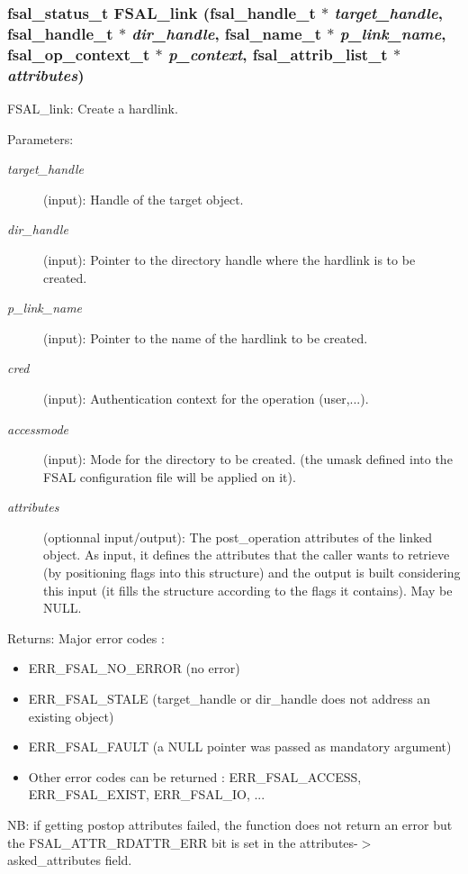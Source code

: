 \subsubsection{\setlength{\rightskip}{0pt plus 5cm}fsal\_\-status\_\-t FSAL\_\-link (fsal\_\-handle\_\-t $\ast$ {\em target\_\-handle}, fsal\_\-handle\_\-t $\ast$ {\em dir\_\-handle}, fsal\_\-name\_\-t $\ast$ {\em p\_\-link\_\-name}, fsal\_\-op\_\-context\_\-t $\ast$ {\em p\_\-context}, fsal\_\-attrib\_\-list\_\-t $\ast$ {\em attributes})}\label{fsal__create_8c_a2}


FSAL\_\-link: Create a hardlink.

\begin{Desc}
\item[Parameters:]
\begin{description}
\item[{\em target\_\-handle}](input): Handle of the target object. \item[{\em dir\_\-handle}](input): Pointer to the directory handle where the hardlink is to be created. \item[{\em p\_\-link\_\-name}](input): Pointer to the name of the hardlink to be created. \item[{\em cred}](input): Authentication context for the operation (user,...). \item[{\em accessmode}](input): Mode for the directory to be created. (the umask defined into the FSAL configuration file will be applied on it). \item[{\em attributes}](optionnal input/output): The post\_\-operation attributes of the linked object. As input, it defines the attributes that the caller wants to retrieve (by positioning flags into this structure) and the output is built considering this input (it fills the structure according to the flags it contains). May be NULL.\end{description}
\end{Desc}
\begin{Desc}
\item[Returns:]Major error codes :\begin{itemize}
\item ERR\_\-FSAL\_\-NO\_\-ERROR (no error)\item ERR\_\-FSAL\_\-STALE (target\_\-handle or dir\_\-handle does not address an existing object)\item ERR\_\-FSAL\_\-FAULT (a NULL pointer was passed as mandatory argument)\item Other error codes can be returned : ERR\_\-FSAL\_\-ACCESS, ERR\_\-FSAL\_\-EXIST, ERR\_\-FSAL\_\-IO, ...\end{itemize}
\end{Desc}
NB: if getting postop attributes failed, the function does not return an error but the FSAL\_\-ATTR\_\-RDATTR\_\-ERR bit is set in the attributes-$>$asked\_\-attributes field. 

